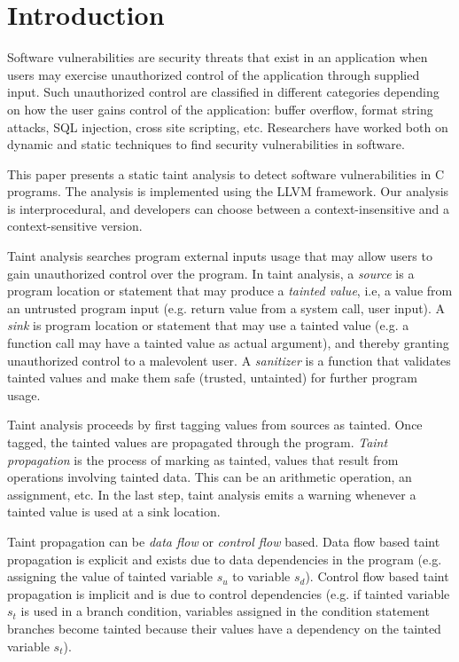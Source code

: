 \section{Introduction}
Software vulnerabilities are security threats
that exist in an application when users may exercise
unauthorized  control of the application through supplied input.
Such unauthorized control are classified in different
categories depending on how the user gains control of
the application: buffer overflow, format string attacks,
SQL injection, cross site scripting, etc.
Researchers have worked both on dynamic \cite{Clause:2007:Dytan,
Kiezun:2009:Ardilla} and static techniques 
\cite{Jovanovic:2006:Pixy, Shankar:2001:DFS, livshits05finding, 
Avots:2005:ISS, Dimitru:2009:STAC, Tripp:2009:TET} to find 
security vulnerabilities in software. 

This paper presents a static taint analysis to detect software
vulnerabilities in C programs. The analysis is implemented
using the LLVM framework\cite{Lattner:2004:LLVM}. Our analysis
is interprocedural, and developers can choose between a
context-insensitive and a context-sensitive version. 

Taint analysis searches program external inputs usage that
may allow users to gain unauthorized control over the program. 
In taint analysis, a \textit{source} is a program location
or statement that may produce a \textit{tainted value}, i.e,
a value from an untrusted program input (e.g. return value from a
system call, user input). 
A \textit{sink} is program location or statement that may use
a tainted value (e.g. a function call may have a tainted value as
actual argument), and thereby granting unauthorized control
to a malevolent user.
A \textit{sanitizer} is a function that validates tainted
values and make them safe (trusted, untainted) for further
program usage.

Taint analysis proceeds by first tagging values from sources
as tainted. Once tagged, the tainted values are propagated
through the program.
\textit{Taint propagation} is the process of marking as tainted, 
values that result from operations involving tainted data. This
can be an arithmetic operation, an assignment, etc. In the
last step, taint analysis emits a warning whenever a tainted
value is used at a sink location.

Taint propagation can be \textit{data flow} or \textit{control flow}
based. Data flow based taint propagation is explicit and exists
due to data dependencies in the program (e.g. assigning the value
of tainted variable $s_u$ to variable $s_d$).
Control flow based taint propagation is implicit and is due to
control dependencies (e.g. if tainted variable $s_t$ is used in a branch
condition, variables assigned in the condition statement branches
become tainted because their values have a dependency on the
tainted variable $s_t$).

